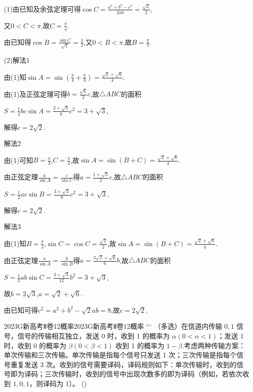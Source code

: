 \documentclass[12pt,UTF-8,a4paper]{ctexart}
\numberwithin{figure}{section}
\theoremstyle{mystyle}
\theoremstyle{mystylekaishu}
\theoremstyle{mystyle}
\numberwithin{xiti}{section}
\begin{document}
\begin{solutions}
(1)由已知及余弦定理可得$\cos C=\frac{a^{2}+b^{2}-c^{2}}{2ab}=\frac{\sqrt{2}}{2}$,

又$0<C<\pi$,故$C=\frac{\pi}{4}$.

由已知得$\cos B=\frac{\sin C}{\sqrt{2}}=\frac{1}{2}$,又$0<B<\pi$,故$B=\frac{\pi}{3}$.

(2)解法1

由(1)知$\sin A=\sin\left(\frac{\pi}{4}+\frac{\pi}{3}\right)=\frac{\sqrt{2}+\sqrt{6}}{4}$.

由(1)及正弦定理可得$b=\frac{\sqrt{6}}{2}c$,故$\triangle ABC$的面积

$S=\frac{1}{2}bc\sin A=\frac{3+\sqrt{3}}{8}c^{2}=3+\sqrt{3}$,

解得$c=2\sqrt{2}$.

解法2

由(1)可知$B=\frac{\pi}{3}$,$C=\frac{\pi}{4}$,故$\sin A=\sin(B+C)=\frac{\sqrt{2}+\sqrt{6}}{4}$.

由正弦定理$\frac{a}{\sin A}=\frac{c}{\sin C}$得$a=\frac{1+\sqrt{3}}{2}c$,故$\triangle ABC$的面积

$S=\frac{1}{2}ac\sin B=\frac{3+\sqrt{3}}{8}c^{2}=3+\sqrt{3}$,

解得$c=2\sqrt{2}$.

解法3

由(1)知$B=\frac{\pi}{3}$,$\sin C=\cos C=\frac{\sqrt{2}}{2}$,故$\sin A=\sin(B+C)=\frac{\sqrt{2}+\sqrt{6}}{4}$.

由正弦定理$\frac{a}{\sin A}=\frac{b}{\sin B}$得$a=\frac{3\sqrt{2}+\sqrt{6}}{6}b$,故$\triangle ABC$的面积

$S=\frac{1}{2}ab\sin C=\frac{3+\sqrt{3}}{12}b^{2}=3+\sqrt{3}$,

故$b=2\sqrt{3}$,$a=\sqrt{2}+\sqrt{6}$.

由已知可得$c^{2}=a^{2}+b^{2}-\sqrt{2}ab=8$,故$c=2\sqrt{2}$.
\end{solutions}


\begin{problem}{2023}{G}{新高考Ⅱ卷}{12}{概率}{2023}{G}{新高考Ⅱ卷}{12}{概率}
```
（多选）在信道内传输 $0,1$ 信号，信号的传输相互独立，发送 0 时，收到 1 的概率为 $\alpha(0<\alpha<1)$；发送 1 时，收到 0 的概率为 $\beta(0<\beta<1)$ 收到 1 的概率为 $1-\beta$.考虑两种传输方案：单次传输和三次传输。单次传输是指每个信号只发送 1 次；三次传输是指每个信号重复发送 3 次。收到的信号需要译码，译码规则如下：单次传输时，收到的信号即为译码；三次传输时，收到的信号中出现次数多的即为译码（例如，若依次收到 $1,0,1$，则译码为 1）。 (\hspace{1cm})
\begin{choices}
\end{choices}
\end{problem}
\end{document}
